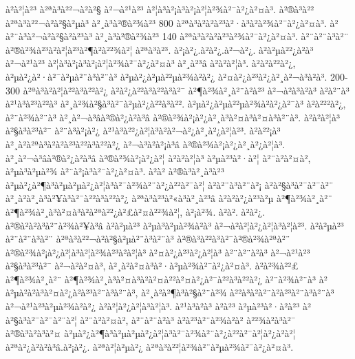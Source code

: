 à²à²¦à²³ à²ªà³à²²¬à²à²§ à²¬à²¹à²³ à²¦à³à²¡à³à²¡à²¦à²¾à²¯à²¿à²¤à³. à²®à³à²² à²ªà³à²²¬à²à²§à²µà³ à²¸à³à²®à²¾à²³ 800 à²ªà³à²à²à²³à²·à³à²à²¾à²¯à²¿à²¤à³. à²à²¨à³à²¬à²à²§à²à²³à³ à²¸à³à²®à²¾à²³ 140 à²ªà³à²à²à²³à²¾à²¯à²¿à²¤à³. à²¨à²¨à³à²¨ à²®à²¾à²³à²à²¦à²³à²¶à²à²²¾à²¦ à²ªà³à²³. à²¡à²¿.à²à²¿.à²¬à²¿. à²à²µà²²¿à²à³ à²¬à²¹à²³ à²¦à³à²¡à³à²¡à²¦à²¾à²¯à²¿à²¤à³ à²¸à²³â à²à²à²¦à³. à²à²à²²à²¿, à²µà²¿à²·à²¯à²µà²¨à³à²¨à³ à²µà²¿à²µà²²µà²¾à²à²¿ à²¤à²¿à²³à²¿à²¸à²¬à³à²à³. 200-300 à²ªà³à²à²¦à²²à³à²²à²¿ à²à²¿à²²à³à²²à³à²¯ à²¶à²¾à²¸à²¨à²à²³ à²¬à²à³à²à³ à²à²¨à³ à²¹à³à²³à²²à³ à²¸à²¾à²§à³à²¯à²µà²¿à²²à³à²². à²µà²¿à²µà²²µà²¾à²à²¿à²¯à³ à²à²²²à²¿, à²¨à²¾à²¨à³ à²¸à²¬à³âà²®à²¿à²à³â à²®à²¾à²¡à²¿à²¸à³à²¤à³à²¤à³à²¨à³. à²à²à²¦à³ à²§à³à²³à²¯ à²¨à³à²¡à²¿ à²¹à³à²²¿à²¦à³à²à²¬à²¿à²¸à²¿à²¦à²³. à²à²²¡à³ à²¸à²à²ªà³à²à²à²³à²²à³à²²à²¿ à²¬à³à²à²¡à³â à²®à²¾à²¡à²¿à²¸à²¿à²¦à³. à²¸à²¬à³âà²®à²¿à²à³â à²®à²¾à²¡à²¿à²¦ à²à²à²¦à³ à²µà²³à²·à²¦ à²¨à²à²¤à²\circ, à²µà³à²µà²¾ à²¨à²¡à³à²¯à²¿à²¤à³. à²à² à²®à³à²¸à³à²³ à²µà²¿à²¶à³à²µà²µà²¿à²¦à³à²¯à²¾à²¨à²¿à²²à²¯à²¦ à²à²¨à³à²¨à²¡ à²à²§à³à²¯à²¯à²¨ à²¸à²à²¸à³à²¥à³à²¯à²²à³à²²à²¿ à²ªà³à²³à²«à³à²¸à²³â à²à²à²¿à²³à²µ à²¶à²¾à²¸à²¨ à²¶à²¾à²¸à³à²¤à³à²\circ à²ªà²²¿à²£à²¤à²²¾à²¦, à²¡à²¾. à²à². à²à²¿. à²®à²à²à³à²¨à²¾à²¥à³â à²à²µà²³ à²µà³à²µà²¾à²à³ à²¬à²à²¦à²¿à²¦à³à²¦à²³. à²à²µà²³ à²¨à²¨à³à²¨ à²ªà³à²²¬à²à²§à²µà²¨à³à²¨à³ à²®à³à²²à³à²¯à²®à²¾à²ªà²¨ à²®à²¾à²¡à²¿à²¦à³à²¦à²¾à²³à²à²¦à³ à²¤à²¿à²³à²¿à²¦à³ à²¨à²¨à²à³ à²¬à²¹à²³ à²§à³à²³à²¯ à²¬à²à²¤à³, à²¸à²à²¤à³à²·à²µà²¾à²¯à²¿à²¤à³. à²à²¾à²²£ à²¶à²¾à²¸à²¨ à²¶à²¾à²¸à³à²¤à³à²\circ à²¤à²²à²¤à²¿à²¯à²²à³à²²à²¿ à²¨à²¾à²¨à³ à²à²µà²\circ à²à³à²¤à²¿à²à²³à²¨à³à²¨à³, à²¸à²à²¶à³à²§à²¨à²¾ à²²à³à²à²¨à²à²³à²¨à³à²¨à³ à²¬à²¹à²³à²µà²¾à²à²¿ à²à²¦à²¿à²¦à³à²¦à³. à²¹à³à²à³ à²à²³ à²µà²³à²·à²à²³ à²à²§à³à²¯à²¯à²¨à²¦ à²¨à²à²¤à²\circ, à²¨à²¨à²à³ à²à²³à²¨à²¾à²à² à²²¾à²à³à²¯ à²®à³à²à³à²¤ à²µà²¿à²¶à³à²µà²µà²¿à²¦à³à²¯à²¾à²¨à²¿à²²à²¯à²¦à²¿à²à²¦ à²ªà²¿à²à²à³â.à²¡à²¿. à²ªà²¦à²µà²¿ à²ªà³à²²¦à²¾à²¨à²µà²¾à²¯à²¿à²¤à³. 

